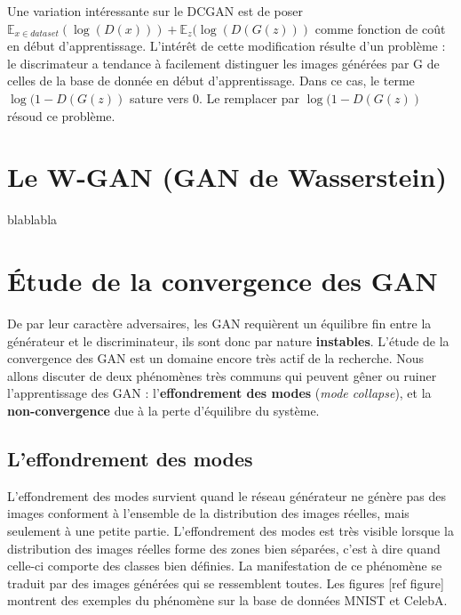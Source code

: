 Une variation intéressante sur le DCGAN est de poser $  \mathbb{E}_{x \in dataset}(\log (D(x))) + \mathbb{E}_{z}(\log (D(G(z)))$ comme fonction de coût en début d'apprentissage. L'intérêt de cette modification résulte d'un problème : le discrimateur a tendance à facilement distinguer les images générées par G de celles de la base de donnée en début d'apprentissage. Dans ce cas, le terme $\log (1 - D(G(z))$ sature vers 0. Le remplacer par $\log (1 - D(G(z))$ résoud ce problème.


\section{Le W-GAN (GAN de Wasserstein)}

blablabla

\section{Étude de la convergence des GAN}

De par leur caractère adversaires, les GAN requièrent un équilibre fin entre la générateur et le discriminateur, ils sont donc par nature \textbf{instables}. L'étude de la convergence des GAN est un domaine encore très actif de la recherche. Nous allons discuter de deux phénomènes très communs qui peuvent gêner ou ruiner l'apprentissage des GAN : l'\textbf{effondrement des modes} (\textit{mode collapse}), et la \textbf{non-convergence} due à la perte d'équilibre du système.

\subsection{L'effondrement des modes}

L'effondrement des modes survient quand le réseau générateur ne génère pas des images conforment à l'ensemble de la distribution des images réelles, mais seulement à une petite partie. L'effondrement des modes est très visible lorsque la distribution des images réelles forme des zones bien séparées, c'est à dire quand celle-ci comporte des classes bien définies. La manifestation de ce phénomène se traduit par des images générées qui se ressemblent toutes. Les figures [ref figure] montrent des exemples du phénomène sur la base de données MNIST et CelebA.

